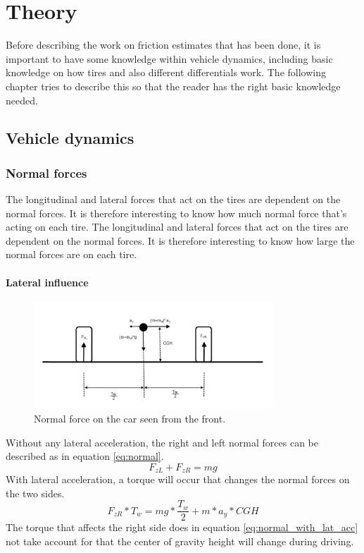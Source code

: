 \chapter{Theory}

Before describing the work on friction estimates that has been done, it is important to have some knowledge within vehicle dynamics, including basic knowledge on how tires and also different differentials work. The following chapter tries to describe this so that the reader has the right basic knowledge needed.

\cite{rajamani}

\section{Vehicle dynamics}

\subsection{Normal forces}

The longitudinal and lateral forces that act on the tires are dependent on the normal forces. It is therefore interesting to know how much normal force that's acting on each tire. 
The longitudinal and lateral forces that act on the tires are dependent on the normal forces. It is therefore interesting to know how large the normal forces are on each tire. 

\subsubsection{Lateral influence}

\begin{figure}[h]
	\centering
	\includegraphics[width=0.8\textwidth]{Pictures/normal_force_lateral}
	\caption{Normal force on the car seen from the front.}
	\label{normal_force_lateral}
\end{figure}
Without any lateral acceleration, the right and left normal forces can be described as in equation \ref{eq:normal}. 
\begin{equation} \label{eq:normal}
	F_{zL} + F_{zR} = mg
\end{equation}
With lateral acceleration, a torque will occur that changes the normal forces on the two sides. 
\begin{equation} \label{eq:normal_with_lat_acc}
	F_{zR}*T_{w} = mg*\frac{T_{w}}{2} + m*a_{y}*CGH
\end{equation}
The torque that affects the right side does in equation \ref{eq:normal_with_lat_acc} not take account for that the center of gravity height will change during driving.

